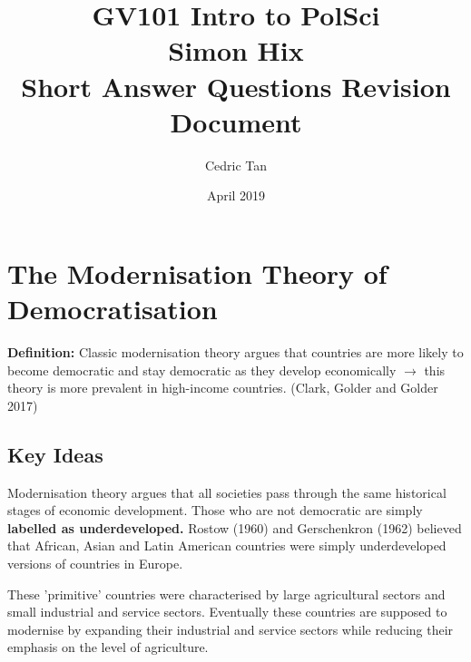 \documentclass[12pt, letterpaper]{article}
\title{
	GV101 Intro to PolSci\\
	\large{Simon Hix}\\
	\large{Short Answer Questions Revision Document}
}
\author{Cedric Tan}
\date{April 2019}
\begin{document}
\maketitle
{}

\newpage
\tableofcontents
\newpage


\section{The Modernisation Theory of Democratisation}

\textbf{Definition:} Classic modernisation theory argues that countries are more likely to become democratic and stay democratic as they develop economically $\rightarrow$ this theory is more prevalent in high-income countries. (Clark, Golder and Golder 2017)

\subsection{Key Ideas}
Modernisation theory argues that all societies pass through the same historical stages of economic development. Those who are not democratic are simply \textbf{labelled as underdeveloped.} Rostow (1960) and Gerschenkron (1962) believed that African, Asian and Latin American countries were simply underdeveloped versions of countries in Europe.

These 'primitive' countries were characterised by large agricultural sectors and small industrial and service sectors. Eventually these countries are supposed to modernise by expanding their industrial and service sectors while reducing their emphasis on the level of agriculture.
\end{document}
